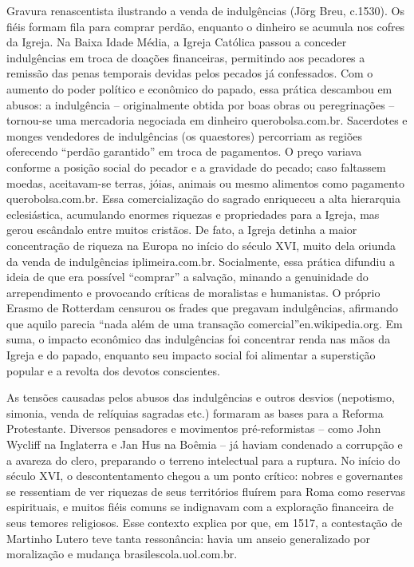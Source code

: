 Gravura renascentista ilustrando a venda de indulgências (Jörg Breu, c.1530). Os fiéis formam fila para comprar perdão, enquanto o dinheiro se acumula nos cofres da Igreja.
Na Baixa Idade Média, a Igreja Católica passou a conceder indulgências em troca de doações financeiras, permitindo aos pecadores a remissão das penas temporais devidas pelos pecados já confessados. Com o aumento do poder político e econômico do papado, essa prática descambou em abusos: a indulgência -- originalmente obtida por boas obras ou peregrinações -- tornou-se uma mercadoria negociada em dinheiro querobolsa.com.br. Sacerdotes e monges vendedores de indulgências (os quaestores) percorriam as regiões oferecendo “perdão garantido” em troca de pagamentos. O preço variava conforme a posição social do pecador e a gravidade do pecado; caso faltassem moedas, aceitavam-se terras, jóias, animais ou mesmo alimentos como pagamento querobolsa.com.br. Essa comercialização do sagrado enriqueceu a alta hierarquia eclesiástica, acumulando enormes riquezas e propriedades para a Igreja, mas gerou escândalo entre muitos cristãos. De fato, a Igreja detinha a maior concentração de riqueza na Europa no início do século XVI, muito dela oriunda da venda de indulgências iplimeira.com.br. Socialmente, essa prática difundiu a ideia de que era possível “comprar” a salvação, minando a genuinidade do arrependimento e provocando críticas de moralistas e humanistas. O próprio Erasmo de Rotterdam censurou os frades que pregavam indulgências, afirmando que aquilo parecia “nada além de uma transação comercial”en.wikipedia.org. Em suma, o impacto econômico das indulgências foi concentrar renda nas mãos da Igreja e do papado, enquanto seu impacto social foi alimentar a superstição popular e a revolta dos devotos conscientes.

As tensões causadas pelos abusos das indulgências e outros desvios (nepotismo, simonia, venda de relíquias sagradas etc.) formaram as bases para a Reforma Protestante. Diversos pensadores e movimentos pré-reformistas -- como John Wycliff na Inglaterra e Jan Hus na Boêmia -- já haviam condenado a corrupção e a avareza do clero, preparando o terreno intelectual para a ruptura. No início do século XVI, o descontentamento chegou a um ponto crítico: nobres e governantes se ressentiam de ver riquezas de seus territórios fluírem para Roma como reservas espirituais, e muitos fiéis comuns se indignavam com a exploração financeira de seus temores religiosos. Esse contexto explica por que, em 1517, a contestação de Martinho Lutero teve tanta ressonância: havia um anseio generalizado por moralização e mudança brasilescola.uol.com.br.

